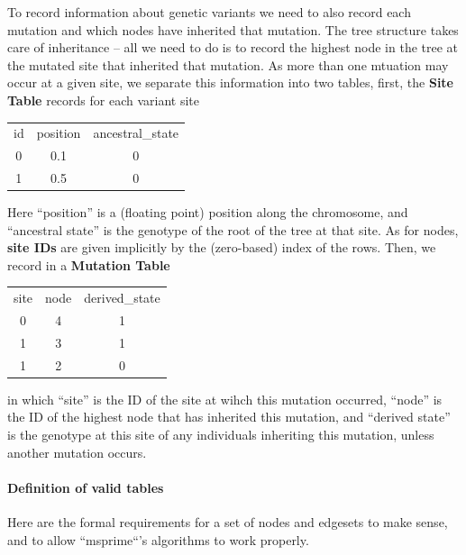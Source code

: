 \documentclass{article}
\newcommand{\plr}[1]{{\em \color{blue} #1}}
\begin{document}
To record information about genetic variants we need to also record each mutation
and which nodes have inherited that mutation.
The tree structure takes care of inheritance -- all we need to do
is to record the highest node in the tree at the mutated site
that inherited that mutation.
As more than one mtuation may occur at a given site,
we separate this information into two tables,
first, the \textbf{Site Table} records for each variant site
\begin{center}
\begin{tabular}{ccc}
    id  &   position  & ancestral\_state \\
    0   &  0.1        & 0 \\
    1   &  0.5        & 0 \\
\end{tabular}
\end{center}
Here ``position'' is a (floating point) position along the chromosome,
and ``ancestral state'' is the genotype of the root of the tree at that site.
As for nodes, \textbf{site IDs} are given implicitly
by the (zero-based) index of the rows.
Then, we record in a \textbf{Mutation Table}
\begin{center}
\begin{tabular}{ccc}
    site  & node  & derived\_state \\
    0	  & 4	  & 1 \\
    1	  & 3	  & 1 \\
    1	  & 2	  & 0 \\
\end{tabular}
\end{center}
in which ``site'' is the ID of the site at wihch this mutation occurred,
``node'' is the ID of the highest node that has inherited this mutation,
and ``derived state'' is the genotype at this site of any individuals inheriting this mutation,
unless another mutation occurs.

\paragraph{Definition of valid tables}
Here are the formal requirements for a set of nodes and edgesets to make sense,
and to allow ``msprime``'s algorithms to work properly.
\end{document}

